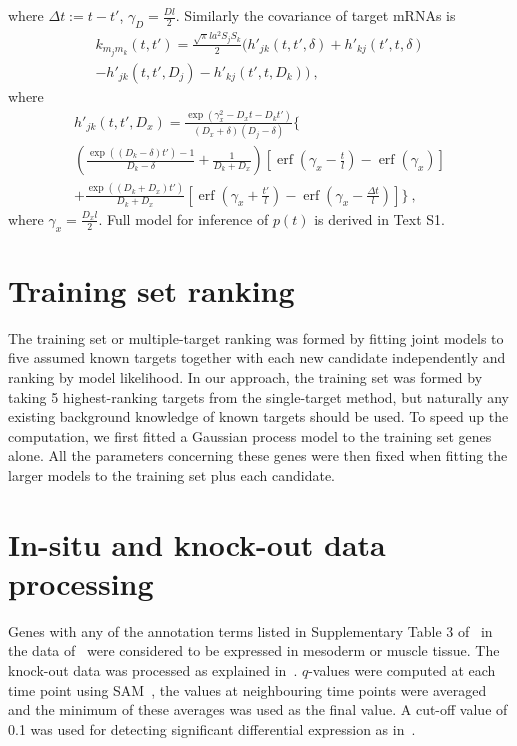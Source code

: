 \documentclass{pnastwo}
\newcommand{\erf}{\operatorname{erf}}
\begin{document}
\begin{article}
\begin{materials}
  where $\Delta t := t - t'$, $\gamma_D = \frac{D l}{2}$.
  Similarly the covariance of target mRNAs is
  \begin{multline*}
    k_{m_j m_k}(t, t')
    = \frac{\sqrt{\pi} l a^2 S_j S_k}{2} \bigg(
    h'_{jk}(t, t', \delta) + h'_{kj}(t', t, \delta) \\
    - h'_{jk}(t, t', D_j) - h'_{kj}(t', t, D_k)
    \bigg)\ ,
  \end{multline*}
  where
  \begin{multline*}
    h'_{jk}(t, t', D_x) = 
    \frac{\exp(\gamma_x^2 -D_x t - D_k t')}{(D_x + \delta) (D_j - \delta)}
    \bigg\{ 
    \\
    \left(\frac{\exp((D_k-\delta) t') - 1}{D_k-\delta} +
      \frac{1}{D_k + D_x} \right)
    \left[\erf\left(\gamma_x - \frac{t}{l}\right) - \erf\left(\gamma_x\right)\right]
    \\
    + \frac{\exp((D_k+D_x)t')}{D_k+D_x}
    \left[\erf\left(\gamma_x + \frac{t'}{l}\right)
    - \erf\left(\gamma_x - \frac{\Delta t}{l}\right)\right]
    \bigg\}\ ,
  \end{multline*}
  where $\gamma_x = \frac{D_x l}{2}$.
  Full model for inference of $p(t)$ is derived in Text S1.

  \section{Training set ranking}
  The training set or multiple-target ranking was formed by fitting
  joint models to five assumed known targets together with each new
  candidate independently and ranking by model likelihood.  In our
  approach, the training set was formed by taking 5 highest-ranking
  targets from the single-target method, but naturally any existing background
  knowledge of known targets should be used.  To speed up the
  computation, we first fitted a Gaussian process model to the
  training set genes alone.  All the parameters concerning these genes
  were then fixed when fitting the larger models to the training set
  plus each candidate.

  \section{In-situ and knock-out data processing}
  Genes with any of the annotation terms listed in Supplementary Table
  3 of~\cite{Zinzen2009} in the data of~\cite{Tomancak2002} were
  considered to be expressed in mesoderm or muscle tissue.
  The knock-out data was processed as explained
  in~\cite{Sandmann2006a}.  $q$-values were computed at each time
  point using SAM~\cite{Saeed2003,Tusher2001}, the values at
  neighbouring time points were averaged and the minimum of these
  averages was used as the final value.  A cut-off value of 0.1 was
  used for detecting significant differential expression as
  in~\cite{Sandmann2006a}.


\end{materials}
\end{article}
\end{document}
